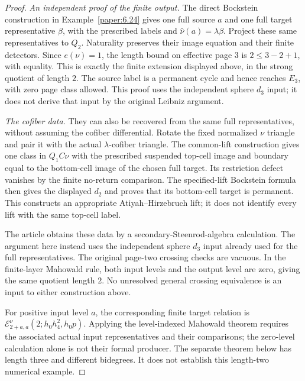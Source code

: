 \begin{proof}
\textit{An independent proof of the finite output.} The direct Bockstein
construction in Example~\ref{paper:6.24} gives one full source $a$ and
one full target representative $\beta$, with the prescribed labels and
$\widehat\nu(a)=\lambda\beta$. Project these same representatives to
$Q_2$. Naturality preserves their image equation and their finite
detectors. Since $e(\nu)=1$, the length bound on effective page $3$ is
$2\le3-2+1$, with equality. This is exactly the finite extension
displayed above, in the strong quotient of length $2$. The source
label is a permanent cycle and hence reaches $E_3$, with zero page
class allowed. This proof uses the independent sphere $d_3$ input;
it does not derive that input by the original Leibniz argument.

\textit{The cofiber data.} They can also be recovered from the same
full representatives, without assuming the cofiber differential.
Rotate the fixed normalized $\nu$ triangle and pair it with the
actual $\lambda$-cofiber triangle. The common-lift construction
gives one class in $Q_1C\nu$ with the prescribed suspended top-cell
image and boundary equal to the bottom-cell image of the chosen
full target. Its restriction defect vanishes by the finite
no-return comparison. The specified-lift Bockstein formula then
gives the displayed $d_2$ and proves that its bottom-cell target is
permanent. This constructs an appropriate Atiyah--Hirzebruch lift;
it does not identify every lift with the same top-cell label.

The article obtains these data by a secondary-Steenrod-algebra
calculation. The argument here instead uses the independent sphere
$d_3$ input already used for the full representatives. The original
page-two crossing checks are vacuous. In the finite-layer Mahowald
rule, both input levels and the output level are zero, giving the
same quotient length $2$. No unresolved general crossing
equivalence is an input to either construction above.

For positive input level $a$, the corresponding finite target relation
is $\mathcal E^\nu_{2+a,a}(2;h_0h_4^2,h_0p)$.
Applying the level-indexed Mahowald theorem requires the associated
actual input representatives and their comparisons; the zero-level
calculation alone is not their formal producer.
The separate theorem below has length three and different bidegrees.
It does not establish this length-two numerical example.
\end{proof}

